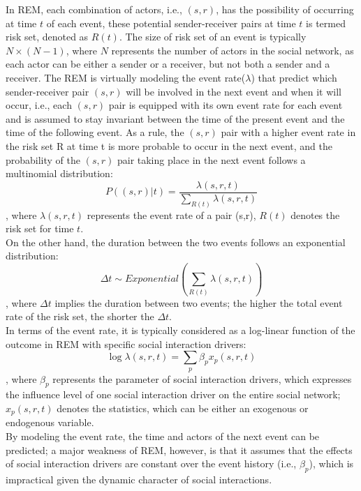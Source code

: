 \documentclass[]{interact}
\theoremstyle{plain}%
\theoremstyle{definition}
\theoremstyle{remark}
\begin{document}
In REM, each combination of actors, i.e., $(s,r)$, has the possibility of occurring at time $t$ of each event, these potential sender-receiver pairs at time $t$ is termed risk set, denoted as $R(t)$. The size of risk set of an event is typically $N \times (N-1)$, where $N$ represents the number of actors in the social network, as each actor can be either a sender or a receiver, but not both a sender and a receiver. The REM is virtually modeling the event rate($\lambda$) that predict which sender-receiver pair $(s,r)$ will be involved in the next event and when it will occur, i.e., each $(s,r)$ pair is equipped with its own event rate for each event and is assumed to stay invariant between the time of the present event and the time of the following event. As a rule, the $(s,r)$ pair with a higher event rate in the risk set R at time t is more probable to occur in the next event, and the probability of the $(s,r)$ pair taking place in the next event follows a multinomial distribution:
\begin{equation} \label{1}
	P \left((s,r) | t \right) = \dfrac{\lambda(s,r,t)} {\sum_{R(t)} \lambda(s,r,t)}
\end{equation}
, where $\lambda(s,r,t)$ represents the event rate of a pair (s,r), $R(t)$ denotes the risk set for time $t$. \\

On the other hand, the duration between the two events follows an exponential distribution: 
\begin{equation} \label{2}
	\Delta t \sim Exponential \left(\sum_{R(t)} \lambda(s,r,t) \right)
\end{equation}
, where $\Delta t$ implies the duration between two events; the higher the total event rate of the risk set, the shorter the $\Delta t$. \\

In terms of the event rate, it is typically considered as a log-linear function of the outcome in REM with specific social interaction drivers:
\begin{equation} \label{3}
	\log \lambda(s,r,t) = \sum_{p} \beta_p x_p(s,r,t)
\end{equation}
, where $\beta_p$ represents the parameter of social interaction drivers, which expresses the influence level of one social interaction driver on the entire social network; $x_p(s,r,t)$ denotes the statistics, which can be either an exogenous or endogenous variable. \\

By modeling the event rate, the time and actors of the next event can be predicted; a major weakness of REM, however, is that it assumes that the effects of social interaction drivers are constant over the event history (i.e., $\beta_p$), which is impractical given the dynamic character of social interactions.
\end{document}
